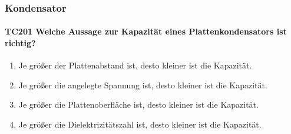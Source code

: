 \documentclass[8pt]{article}
\begin{document}
\begin{enumerate}
\begin{enumerate}[nolistsep,label=\Alph*]
{\pagebreak
\subsubsection{Kondensator}
\paragraph*{TC201 Welche Aussage zur Kapazität eines Plattenkondensators ist richtig?}
\begin{enumerate}[nolistsep,label=\Alph*]
\item Je größer der Plattenabstand ist, desto kleiner ist die Kapazität.
\item Je größer die angelegte Spannung ist, desto kleiner ist die Kapazität.
\item Je größer die Plattenoberfläche ist, desto kleiner ist die Kapazität.
\item Je größer die Dielektrizitätszahl ist, desto kleiner ist die Kapazität.
\end{enumerate}

}
\end{enumerate}
\end{enumerate}
\end{document}

